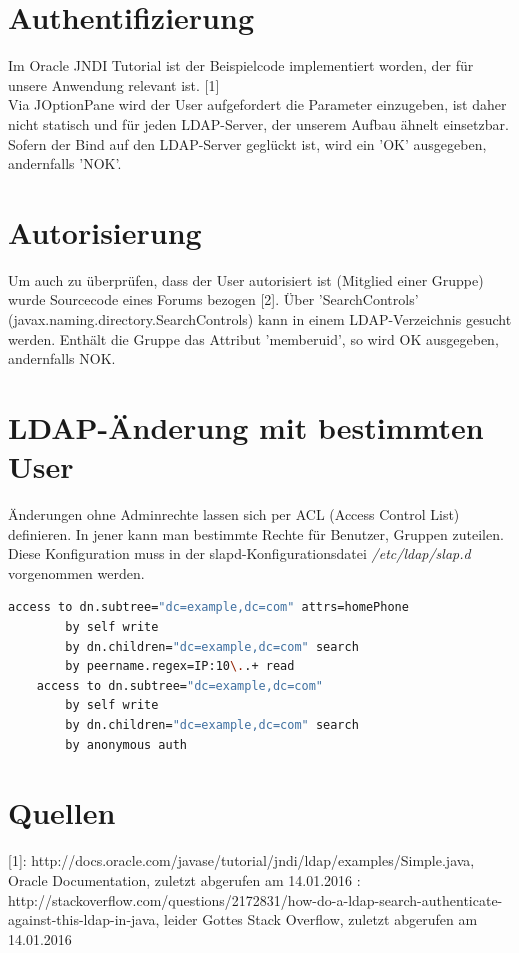 \documentclass[letterpaper, 12pt]{article}
\let\tempsection\section
\renewcommand\section[1]{\vspace{-0.3cm}\tempsection{#1}\vspace{-0.3cm}}
\begin{document}
\section{Authentifizierung}
Im Oracle JNDI Tutorial ist der Beispielcode implementiert worden, der für unsere Anwendung relevant ist. [1] \\
Via JOptionPane wird der User aufgefordert die Parameter einzugeben, ist daher nicht statisch und für jeden LDAP-Server, der unserem Aufbau ähnelt einsetzbar. Sofern der Bind auf den LDAP-Server geglückt ist, wird ein 'OK' ausgegeben, andernfalls 'NOK'.
\section{Autorisierung}
Um auch zu überprüfen, dass der User autorisiert ist (Mitglied einer Gruppe) wurde Sourcecode eines Forums bezogen [2]. Über 'SearchControls' (javax.naming.directory.SearchControls) kann in einem LDAP-Verzeichnis gesucht werden. Enthält die Gruppe das Attribut 'memberuid', so wird OK ausgegeben, andernfalls NOK.
\section{LDAP-Änderung mit bestimmten User}
Änderungen ohne Adminrechte lassen sich per ACL (Access Control List) definieren. In jener kann man bestimmte Rechte für Benutzer, Gruppen zuteilen. Diese Konfiguration muss in der slapd-Konfigurationsdatei \textit{/etc/ldap/slap.d} vorgenommen werden. \\
\begin{lstlisting}[frame=single, language=bash, caption=ACL]
access to dn.subtree="dc=example,dc=com" attrs=homePhone
        by self write
        by dn.children="dc=example,dc=com" search
        by peername.regex=IP:10\..+ read
    access to dn.subtree="dc=example,dc=com"
        by self write
        by dn.children="dc=example,dc=com" search
        by anonymous auth
\end{lstlisting} 
\newpage

\section{Quellen}
[1]: http://docs.oracle.com/javase/tutorial/jndi/ldap/examples/Simple.java, Oracle Documentation, zuletzt abgerufen am 14.01.2016 \newline
[2]: http://stackoverflow.com/questions/2172831/how-do-a-ldap-search-authenticate-against-this-ldap-in-java, leider Gottes Stack Overflow, zuletzt abgerufen am 14.01.2016 \\
\lstlistoflistings
\listoffigures
\end{document}
